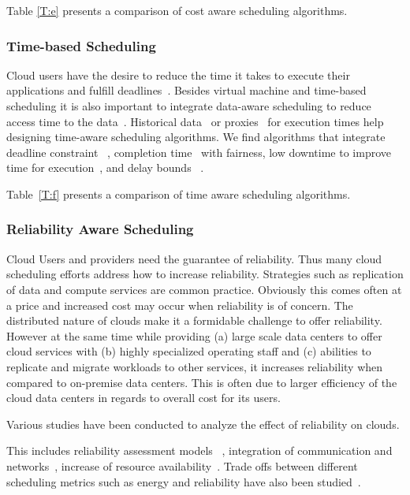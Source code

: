 \documentclass[final,5p,times,twocolumn]{elsarticle}
\begin{document}
Table \ref{T:e} presents a comparison of cost aware scheduling
algorithms.



\subsubsection{Time-based Scheduling}\label{sec:time}


Cloud users have the desire to reduce the time it takes to execute
their applications and fulfill
deadlines~\cite{arabnejad2017scheduling}.  Besides virtual machine and
time-based scheduling it is also important to integrate data-aware
scheduling to reduce access time to the data~\cite{vandenbosshe2013}.
Historical data~\cite{thomas2015credit} or
proxies~\cite{erdil2013autonomic} for execution times help designing
time-aware scheduling algorithms.  We find algorithms that integrate
deadline constraint ~\cite{li2016energy}, completion
time~\cite{xu2011job} with fairness, low downtime to improve time for
execution~\cite{frincu2014scheduling}, and delay bounds
~\cite{yuan2017time}.

Table~\ref{T:f} presents a comparison of time aware
scheduling algorithms.



\subsubsection{Reliability Aware Scheduling}\label{sec:reliability}



Cloud Users and providers need the guarantee of reliability. Thus many
cloud scheduling efforts address how to increase
reliability. Strategies such as replication of data and compute
services are common practice. Obviously this comes often at a price
and increased cost may occur when reliability is of concern. The
distributed nature of clouds make it a formidable challenge to offer
reliability. However at the same time while providing (a) large scale
data centers to offer cloud services with (b) highly specialized
operating staff and (c) abilities to replicate and migrate workloads
to other services, it increases reliability when compared to
on-premise data centers. This is often due to larger efficiency of the
cloud data centers in regards to overall cost for its users.

Various studies have been conducted to analyze the effect of reliability on clouds.

This includes reliability assessment models
~\cite{malik2012reliability}, integration of communication and
networks~\cite{jing2015reliability}, increase of resource
availability~\cite{latiff2016fault}. Trade offs between different
scheduling metrics such as energy and reliability have also been
studied~\cite{tang2016energy}.
\end{document}
